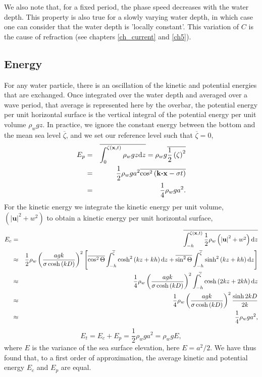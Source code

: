 We also note that, for a fixed period, the phase speed decreases 
with the water depth. This property is also true for a slowly varying water depth, 
in which case one can consider that the water depth is 'locally constant'. 
This variation of $C$ is the cause of refraction (see chapters \ref{ch_current} and \ref{ch5}). 


\subsection{Energy}
For any water particle, there is an oscillation of the kinetic and potential energies that are exchanged. 
Once integrated over the water depth and averaged over a wave period, that average is represented here by 
the overbar, the potential energy per unit horizontal surface is the vertical integral 
of the potential energy per unit volume $ \rho_w g z$. In practice, we ignore the constant energy between the 
bottom and the mean sea level $\overline{\zeta}$, and we set our reference level such that $\overline{\zeta}=0$,
\begin{eqnarray}
    E_p & = & \overline{ \int_{0}^{\zeta\left(\mathbf{x},t\right)} \rho_w g z {\mathrm d}z }
          = \rho_w g  \overline{ \frac{1}{2} \left(\zeta\right)^2 }   \nonumber\\
    & = & \frac{1}{2} \rho_w g a^2 \overline{ \cos^2\left({\mathbf k} \mbox{\boldmath $\cdot$} {\mathbf x}
    - \sigma t \right) } \nonumber\\
    & = & \frac{1}{4} \rho_w g a^2.
\end{eqnarray}
For the kinetic energy we integrate the kinetic energy per unit volume, $\left( \left|{\mathbf u}\right|^2 + w^2 \right)$ to obtain 
a kinetic energy per unit horizontal surface, 
\begin{eqnarray}
    E_c & = & \overline{  \int_{-h}^{\zeta\left(\mathbf{x},t\right)} \frac{1}{2} \rho_w
\left( \left|{\mathbf u}\right|^2 + w^2 \right) {\mathrm d}z } \nonumber\\
    & \approx & \frac{1}{2} \rho_w \left( \frac{a g k}{\sigma \cosh \left( kD \right)}
    \right)^2 \left[  \overline{ \cos^2 \Theta } \int_{-h}^{\overline{\zeta}} \cosh^2\left(kz+kh\right) {\mathrm d}z 
                   + \overline{ \sin^2 \Theta } \int_{-h}^{\overline{\zeta}} \sinh^2\left(kz+kh\right) {\mathrm d}z     \right] \nonumber\\
    & \approx & \frac{1}{4} \rho_w \left( \frac{a g k}{\sigma \cosh \left( kD \right)}
    \right)^2 \int_{-h}^{\overline{\zeta}} \cosh\left(2kz+2kh\right) {\mathrm d}z \nonumber \\
    & \approx & \frac{1}{4} \rho_w \left( \frac{a g k}{\sigma \cosh \left( kD \right)}
    \right)^2 \frac{\sinh 2kD}{2k}  \nonumber \\
    & \approx & \frac{1}{4} \rho_w g a^2,
\end{eqnarray}
\begin{equation}
    E_t= E_c+E_p= \frac{1}{2} \rho_w g a^2 = \rho_w g  E  ,\label{Etot}
\end{equation}
where $E$ is the variance of the sea surface elevation, here $E=a^2 /2$. 
We have thus found that, to a first order of approximation, the average kinetic and potential energy 
 $E_c$ and $E_p$ are equal. 

